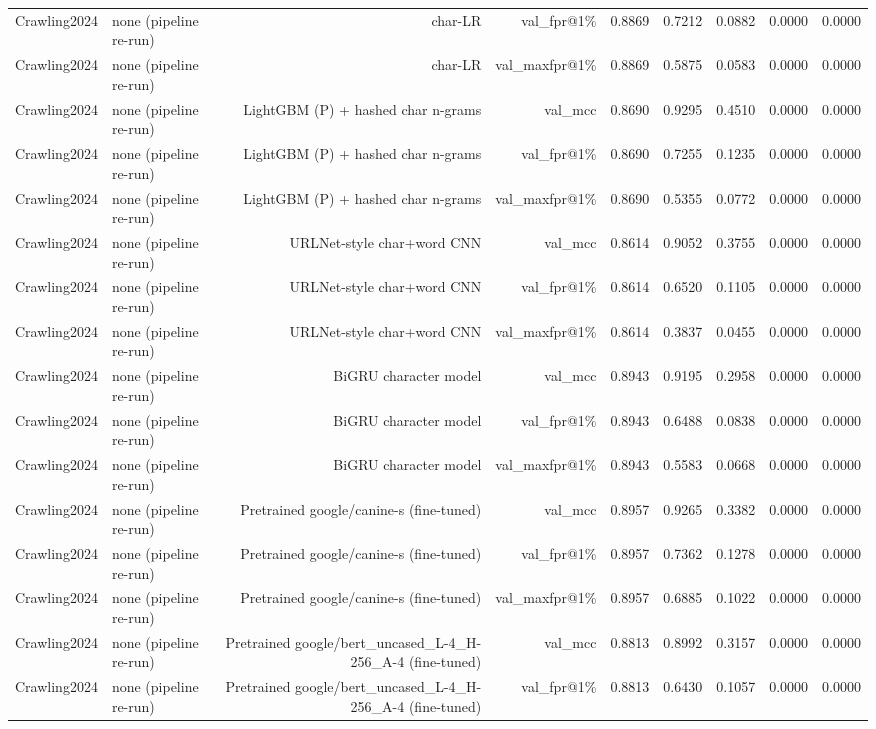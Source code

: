\begin{table}[t]
\begin{tabular}{llrrrrrrr}
Crawling2024 & none (pipeline re-run) & char-LR & val\_fpr@1\% & 0.8869 & 0.7212 & 0.0882 & 0.0000 & 0.0000 \\
Crawling2024 & none (pipeline re-run) & char-LR & val\_maxfpr@1\% & 0.8869 & 0.5875 & 0.0583 & 0.0000 & 0.0000 \\
Crawling2024 & none (pipeline re-run) & LightGBM (P) + hashed char n-grams & val\_mcc & 0.8690 & 0.9295 & 0.4510 & 0.0000 & 0.0000 \\
Crawling2024 & none (pipeline re-run) & LightGBM (P) + hashed char n-grams & val\_fpr@1\% & 0.8690 & 0.7255 & 0.1235 & 0.0000 & 0.0000 \\
Crawling2024 & none (pipeline re-run) & LightGBM (P) + hashed char n-grams & val\_maxfpr@1\% & 0.8690 & 0.5355 & 0.0772 & 0.0000 & 0.0000 \\
Crawling2024 & none (pipeline re-run) & URLNet-style char+word CNN & val\_mcc & 0.8614 & 0.9052 & 0.3755 & 0.0000 & 0.0000 \\
Crawling2024 & none (pipeline re-run) & URLNet-style char+word CNN & val\_fpr@1\% & 0.8614 & 0.6520 & 0.1105 & 0.0000 & 0.0000 \\
Crawling2024 & none (pipeline re-run) & URLNet-style char+word CNN & val\_maxfpr@1\% & 0.8614 & 0.3837 & 0.0455 & 0.0000 & 0.0000 \\
Crawling2024 & none (pipeline re-run) & BiGRU character model & val\_mcc & 0.8943 & 0.9195 & 0.2958 & 0.0000 & 0.0000 \\
Crawling2024 & none (pipeline re-run) & BiGRU character model & val\_fpr@1\% & 0.8943 & 0.6488 & 0.0838 & 0.0000 & 0.0000 \\
Crawling2024 & none (pipeline re-run) & BiGRU character model & val\_maxfpr@1\% & 0.8943 & 0.5583 & 0.0668 & 0.0000 & 0.0000 \\
Crawling2024 & none (pipeline re-run) & Pretrained google/canine-s (fine-tuned) & val\_mcc & 0.8957 & 0.9265 & 0.3382 & 0.0000 & 0.0000 \\
Crawling2024 & none (pipeline re-run) & Pretrained google/canine-s (fine-tuned) & val\_fpr@1\% & 0.8957 & 0.7362 & 0.1278 & 0.0000 & 0.0000 \\
Crawling2024 & none (pipeline re-run) & Pretrained google/canine-s (fine-tuned) & val\_maxfpr@1\% & 0.8957 & 0.6885 & 0.1022 & 0.0000 & 0.0000 \\
Crawling2024 & none (pipeline re-run) & Pretrained google/bert\_uncased\_L-4\_H-256\_A-4 (fine-tuned) & val\_mcc & 0.8813 & 0.8992 & 0.3157 & 0.0000 & 0.0000 \\
Crawling2024 & none (pipeline re-run) & Pretrained google/bert\_uncased\_L-4\_H-256\_A-4 (fine-tuned) & val\_fpr@1\% & 0.8813 & 0.6430 & 0.1057 & 0.0000 & 0.0000 \\

\end{tabular}
\end{table}
